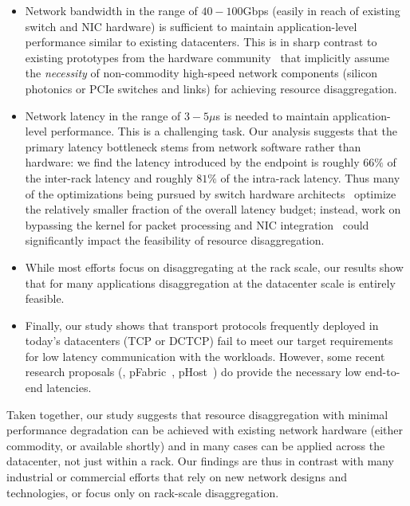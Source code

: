 \begin{itemize}[leftmargin=*]
\itemsep0em
	\item Network bandwidth in the range of $40-100$Gbps (easily in reach of existing switch and NIC hardware) is sufficient to maintain application-level performance similar to existing datacenters. This is in sharp contrast to existing prototypes from the hardware community~\cite{rsa, fdr, hptm, seamicro, firebox, sonuma, ddcHwDesign1} that implicitly assume the {\em necessity} of non-commodity high-speed network components (silicon photonics or PCIe switches and links) for achieving resource disaggregation.
	\item Network latency in the range of $3-5\mu$s is needed to maintain application-level performance. This is a challenging task. Our analysis suggests that the primary latency bottleneck stems from  network software rather than hardware: we find the latency introduced by the endpoint is roughly $66\%$ of the inter-rack latency and roughly $81\%$ of the intra-rack latency. Thus many of the optimizations being pursued by switch hardware architects~\cite{mellanox} optimize the relatively smaller fraction of the overall latency budget; instead, work on bypassing the kernel for packet processing and NIC integration~\cite{cpu-nic} could significantly impact the feasibility of resource disaggregation.
	\item While most efforts focus on disaggregating at the rack scale, our results show that for many applications disaggregation at the datacenter scale is entirely feasible. 
 	\item Finally, our study shows that transport protocols frequently deployed in today's datacenters (TCP or DCTCP) fail to meet our target requirements for low latency communication with the \dis workloads. However, some recent research proposals (\eg, pFabric~\cite{pfabric}, pHost~\cite{phost}) do provide the necessary low end-to-end latencies. 
\end{itemize} 

\noindent
Taken together, our study suggests that resource disaggregation with minimal performance degradation can be achieved with existing network hardware (either commodity, or available shortly) and in many cases can be applied across the datacenter, not just within a rack. Our findings are thus in contrast with many industrial or commercial efforts that rely on new network designs and technologies, or focus only on rack-scale disaggregation.

